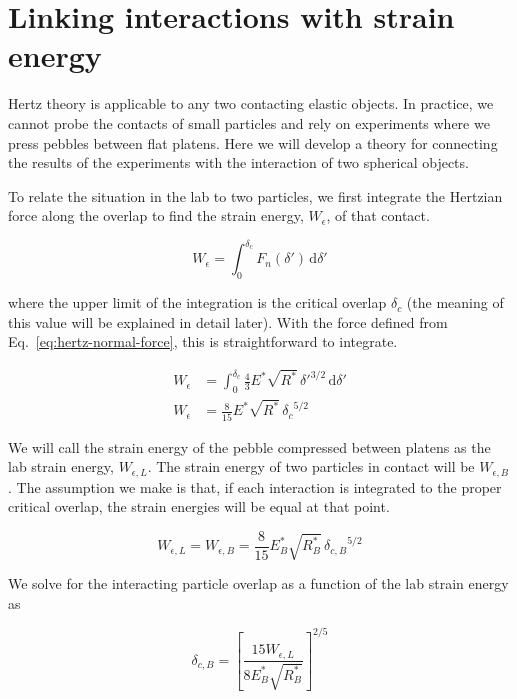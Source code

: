 \section{Linking interactions with strain energy}\label{sec:theoryStrainEnergy}
Hertz theory is applicable to any two contacting elastic objects. In practice, we cannot probe the contacts of small particles and rely on experiments where we press pebbles between flat platens. Here we will develop a theory for connecting the results of the experiments with the interaction of two spherical objects.

To relate the situation in the lab to two particles, we first integrate the Hertzian force along the overlap to find the strain energy, $W_\epsilon$, of that contact. 

\begin{equation}
	W_\epsilon = \int_0^{\delta_c}\!F_n(\delta')\,\mathrm{d}\delta'
\end{equation}

where the upper limit of the integration is the critical overlap $\delta_c$ (the meaning of this value will be explained in detail later). With the force defined from Eq.~\ref{eq:hertz-normal-force}, this is straightforward to integrate.

\begin{align}
	W_\epsilon& = \int_0^{\delta_c}\!  \frac{4}{3}E^*\sqrt{R^*}\,\delta'^{3/2} \,\mathrm{d}\delta' \\
	W_\epsilon & = \frac{8}{15}E^*\sqrt{R^*}\, {\delta_c}^{5/2}
\end{align}

We will call the strain energy of the pebble compressed between platens as the lab strain energy, $W_{\epsilon,L}$. The strain energy of two particles in contact will be $W_{\epsilon,B}$. The assumption we make is that, if each interaction is integrated to the proper critical overlap, the strain energies will be equal at that point.

\begin{equation}
	W_{\epsilon,L} = W_{\epsilon,B} = \frac{8}{15}E_B^*\sqrt{R_B^*}\, {\delta_{c,B}}^{5/2}
\end{equation}

We solve for the interacting particle overlap as a function of the lab strain energy as

\begin{equation}
	\delta_{c,B} = \left[\frac{15W_{\epsilon,L}}{8E_B^*\sqrt{R_B^*}}\right]^{2/5}
\end{equation}

